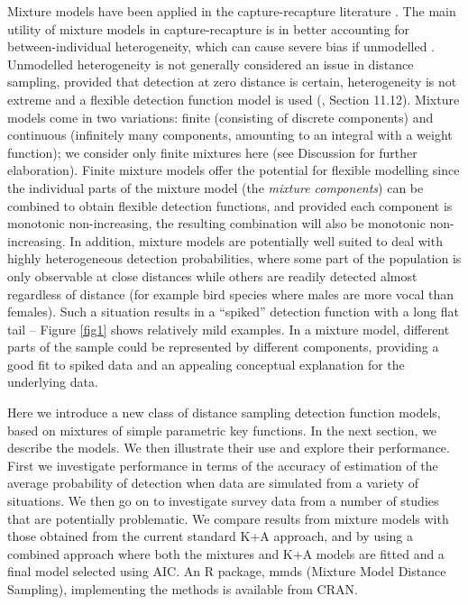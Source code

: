 \documentclass[10pt]{article}
\begin{document}
Mixture models have been applied in the capture-recapture literature \cite{Pledger:2000tc, Dorazio:2003uf, Pledger:2005wy, Morgan:2008wy}. The main utility of mixture models in capture-recapture is in better accounting for between-individual heterogeneity, which can cause severe bias if unmodelled \cite{Link:2003wo}. Unmodelled heterogeneity is not generally considered an issue in distance sampling, provided that detection at zero distance is certain, heterogeneity is not extreme and a flexible detection function model is used (\cite{Buckland:2004ts}, Section 11.12). Mixture models come in two variations: finite (consisting of discrete components) and continuous (infinitely many components, amounting to an integral with a weight function); we consider only finite mixtures here (see Discussion for further elaboration). Finite mixture models offer the potential for flexible modelling since the individual parts of the mixture model (the \textit{mixture components}) can be combined to obtain flexible detection functions, and provided each component is monotonic non-increasing, the resulting combination will also be monotonic non-increasing. In addition, mixture models are potentially well suited to deal with highly heterogeneous detection probabilities, where some part of the population is only observable at close distances while others are readily detected almost regardless of distance (for example bird species where males are more vocal than females). Such a situation results in a ``spiked'' detection function with a long flat tail -- Figure \ref{fig1} shows relatively mild examples. In a mixture model, different parts of the sample could be represented by different components, providing a good fit to spiked data and an appealing conceptual explanation for the underlying data.

Here we introduce a new class of distance sampling detection function models, based on mixtures of simple parametric key functions. In the next section, we describe the models. We then illustrate their use and explore their performance. First we investigate performance in terms of the accuracy of estimation of the average probability of detection when data are simulated from a variety of situations. We then go on to investigate survey data from a number of studies that are potentially problematic. We compare results from mixture models with those obtained from the current standard K+A approach, and by using a combined approach where both the mixtures and K+A models are fitted and a final model selected using AIC. An R package, mmds \cite{mmds} (Mixture Model Distance Sampling), implementing the methods is available from CRAN.
\end{document}
